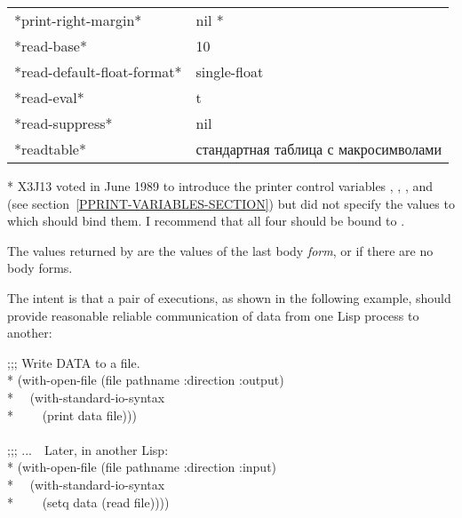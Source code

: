 \begin{defmac}
\begin{table}[t]
\begin{flushleft}
\begin{tabular}{@{}ll@{}}
      {*print-right-margin*}           &     nil \textrm{*} \\
      {*read-base*}                    &     10 \\
      {*read-default-float-format*}    &     single-float \\
      {*read-eval*}                    &     t \\
      {*read-suppress*}                &     nil \\
      {*readtable*}                    &     \textrm{стандартная таблица с макросимволами}
\end{tabular}
\end{flushleft}
* X3J13 voted in June 1989 
to introduce the printer control variables
,
,
,
and 
(see section~\ref{PPRINT-VARIABLES-SECTION})
but did not specify the values to which 
should bind them.  I recommend that all four should be bound to .
\end{table}

    The values returned by  are the values
    of the last body \emph{form}, or  if there are no body forms.

The intent is that a pair of executions, as shown in the following example,
should provide reasonable reliable communication of data from
one Lisp process to another:
\begin{lisp}
;;; Write DATA to a file. \\*
(with-open-file (file pathname :direction :output) \\*
~~(with-standard-io-syntax \\*
~~~~(print data file))) \\
\\
;;; ...~~Later, in another Lisp: \\*
(with-open-file (file pathname :direction :input) \\*
~~(with-standard-io-syntax \\*
~~~~(setq data (read file))))
\end{lisp}


\end{defmac}
